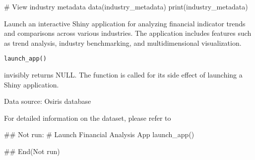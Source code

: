 \documentclass[a4paper]{book}
\begin{document}
%
\begin{Examples}
\begin{ExampleCode}
# View industry metadata
data(industry_metadata)
print(industry_metadata)

\end{ExampleCode}
\end{Examples}
%
\begin{Description}
Launch an interactive Shiny application for analyzing financial indicator trends and comparisons across various industries.
The application includes features such as trend analysis, industry benchmarking, and multidimensional visualization.
\end{Description}
%
\begin{Usage}
\begin{verbatim}
launch_app()
\end{verbatim}
\end{Usage}
%
\begin{Value}
invisibly returns NULL. The function is called for its side effect
of launching a Shiny application.
\end{Value}
%
\begin{References}
Data source: Osiris database
\end{References}
%
\begin{SeeAlso}
For detailed information on the dataset, please refer to 
\end{SeeAlso}
%
\begin{Examples}
\begin{ExampleCode}
## Not run: 
# Launch Financial Analysis App
launch_app()

## End(Not run)

\end{ExampleCode}
\end{Examples}
\printindex{}
\end{document}
